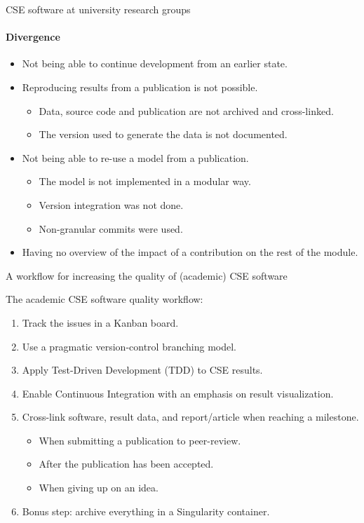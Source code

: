 \documentclass[
	ngerman,%
	aspectratio=169,%
	color={accentcolor=2d},
	logo=true,%
	colorframetitle=true,%
	]{tudabeamer}
\begin{document}
\begin{frame}{CSE software at university research groups}
	\framesubtitle{Divergence}
	
	\vfill
	\begin{itemize}
		\item Not being able to continue development from an earlier state.
		\item Reproducing results from a publication is not possible.  
			\begin{itemize}
				\item Data, source code and publication are not archived and cross-linked. 
				\item The version used to generate the data is not documented. 
			\end{itemize}
		\item Not being able to re-use a model from a publication. 
			\begin{itemize}
				\item The model is not implemented in a modular way.
				\item Version integration was not done.
				\item Non-granular commits were used. 
			\end{itemize}
		\item Having no overview of the impact of a contribution on the rest of the module.
	\end{itemize}

	\medskip

\end{frame}

\begin{frame}{A workflow for increasing the quality of (academic) CSE software} 

	The academic CSE software quality workflow: 
	\begin{enumerate}
		\item Track the issues in a Kanban board.
		\item Use a pragmatic version-control branching model. 
		\item Apply Test-Driven Development (TDD) to CSE results.  
		\item Enable Continuous Integration with an emphasis on result visualization. 
		\item Cross-link software, result data, and report/article when reaching a milestone.
			\begin{itemize}
				\item When submitting a publication to peer-review. 
				\item After the publication has been accepted. 
				\item When giving up on an idea. 
			\end{itemize}
		\item Bonus step: archive everything in a Singularity container.
	\end{enumerate}

\end{frame}
\end{document}
